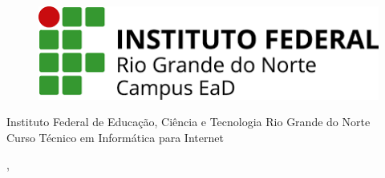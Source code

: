   \begin{capa}%
    \begin{figure}[h!]%
        \centering%
        \includegraphics[scale=0.5]{figs/download.png}%
      \end{figure}%
    \center
	\ABNTEXchapterfont\large{Instituto Federal de Educação, Ciência e Tecnologia Rio Grande do Norte\\Curso Técnico em Informática para Internet}

    \vfill
    \ABNTEXchapterfont\bfseries\LARGE\imprimirtitulo
    \vfill

	\ABNTEXchapterfont\large\imprimirautor
	\vfill
%
    \large\imprimirlocal, \large\imprimirdata

    \vspace*{1cm}
  \end{capa}
